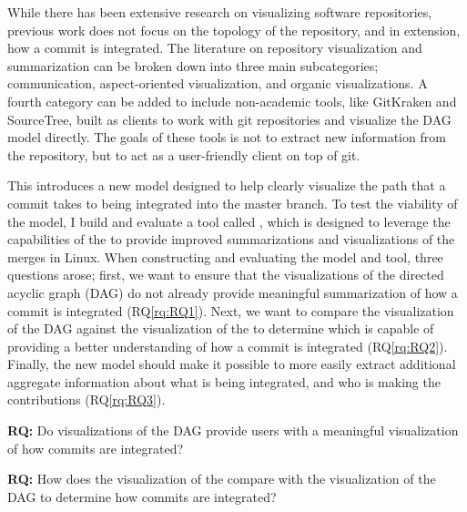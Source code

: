 While there has been extensive research on visualizing software
repositories, previous work does not focus on the topology of the
repository, and in extension, how a commit is integrated. The literature
on repository visualization and summarization can be broken down into
three main subcategories; communication\cite{Cubranic2005,Begel2010},
aspect-oriented visualization\cite{Ambros2005,Burch2005,Ambros2009}, and
organic visualizations\cite{ogawa09,Caudwell2010}. A fourth category can
be added to include non-academic tools, like GitKraken and SourceTree,
built as clients to work with git repositories and visualize the DAG
model directly. The goals of these tools is not to extract new
information from the repository, but to act as a user-friendly client on
top of git.

This \paper{} introduces a new model designed to help clearly visualize
the path that a commit takes to being integrated into the master branch.
To test the viability of the model, I build and evaluate a tool called
\tool{}, which is designed to leverage the capabilities of the \mt{} to
provide improved summarizations and visualizations of the merges in
Linux. When constructing and evaluating the model and tool, three
questions arose; first, we want to ensure that the visualizations of the
directed acyclic graph (DAG) do not already provide meaningful
summarization of how a commit is integrated (RQ\ref{rq:RQ1}). Next, we
want to compare the visualization of the DAG against the visualization
of the \mt{} to determine which is capable of providing a better
understanding of how a commit is integrated (RQ\ref{rq:RQ2}). Finally,
the new model should make it possible to more easily extract additional
aggregate information about what is being integrated, and who is making
the contributions (RQ\ref{rq:RQ3}).

\begin{textbox}
  \textbf{RQ:} Do visualizations of the DAG provide
  users with a meaningful visualization of how commits are integrated?
\end{textbox}


\begin{textbox}
  \textbf{RQ:} How does the visualization of the \mt{}
  compare with the visualization of the DAG to determine how commits are
  integrated?
\end{textbox}

